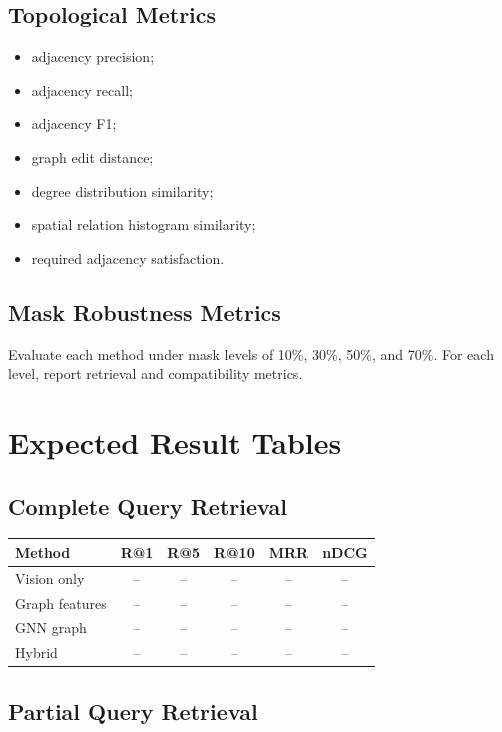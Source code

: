 \documentclass[11pt,a4paper]{article}
\begin{document}
\subsection{Topological Metrics}

\begin{itemize}
    \item adjacency precision;
    \item adjacency recall;
    \item adjacency F1;
    \item graph edit distance;
    \item degree distribution similarity;
    \item spatial relation histogram similarity;
    \item required adjacency satisfaction.
\end{itemize}

\subsection{Mask Robustness Metrics}

Evaluate each method under mask levels of 10\%, 30\%, 50\%, and 70\%. For each level, report retrieval and compatibility metrics.

\section{Expected Result Tables}

\subsection{Complete Query Retrieval}

\begin{center}
\begin{tabular}{lccccc}
\toprule
Method & R@1 & R@5 & R@10 & MRR & nDCG \\
\midrule
Vision only & -- & -- & -- & -- & -- \\
Graph features & -- & -- & -- & -- & -- \\
GNN graph & -- & -- & -- & -- & -- \\
Hybrid & -- & -- & -- & -- & -- \\
\bottomrule
\end{tabular}
\end{center}

\subsection{Partial Query Retrieval}
\end{document}
